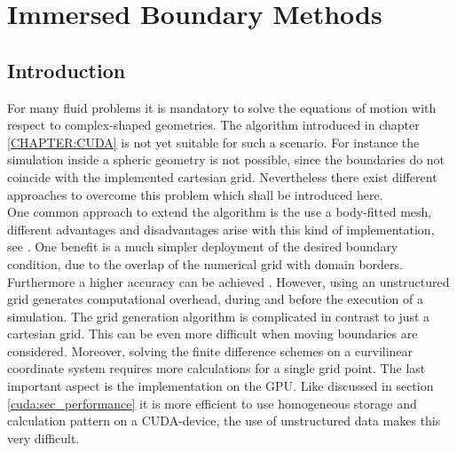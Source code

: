 \chapter{Immersed Boundary Methods}
\label{CHAPTER:IBM}

\section{Introduction}

For many fluid problems it is mandatory to solve the equations of motion with respect to complex-shaped geometries.
The algorithm introduced in chapter \ref{CHAPTER:CUDA} is not yet suitable for such a scenario.
For instance the simulation inside a spheric geometry is not possible, since the boundaries
do not coincide with the implemented cartesian grid. Nevertheless there exist different approaches to overcome this problem
which shall be introduced here. \\
One common approach to extend the algorithm is the use a body-fitted mesh,
different advantages and disadvantages arise with this kind of implementation, see \citep{Mittal2005}.
One benefit is a much simpler deployment of the desired boundary condition, due to the overlap of the numerical grid with domain borders.
Furthermore a higher accuracy can be achieved \citep{Gornak2013}.
However, using an unstructured grid generates  computational overhead, during and before the execution of a simulation.
The grid generation algorithm is complicated in contrast to just a cartesian grid. This can be even more difficult when
moving boundaries are considered.
Moreover, solving the finite difference schemes on a curvilinear coordinate system requires more calculations for a single grid point.
The last important aspect is the implementation on the GPU.
Like discussed in section \ref{cuda:sec_performance} it is more efficient to use homogeneous storage and calculation pattern on a CUDA-device,
the use of unstructured data makes this very difficult.

